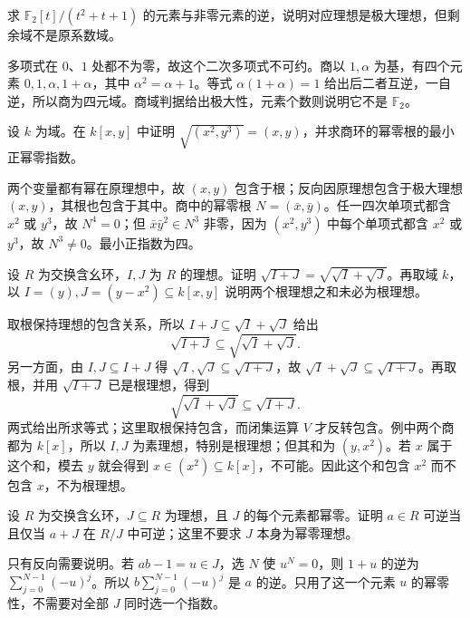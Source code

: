 \begin{exercise}\label{b3:ex:01-residue-field-four}
	求 \(\mathbb F_2[t]/(t^2+t+1)\) 的元素与非零元素的逆，说明对应理想是极大理想，但剩余域不是原系数域。
\end{exercise}
\begin{solution}
	多项式在 \(0\)、\(1\) 处都不为零，故这个二次多项式不可约。商以 \(1,\alpha\) 为基，有四个元素 \(0,1,\alpha,1+\alpha\)，其中 \(\alpha^2=\alpha+1\)。等式 \(\alpha(1+\alpha)=1\) 给出后二者互逆，一自逆，所以商为四元域。商域判据给出极大性，元素个数则说明它不是 \(\mathbb F_2\)。
\end{solution}

\begin{exercise}\label{b3:ex:01-radical-powers}
	设 \(k\) 为域。在 \(k[x,y]\) 中证明 \(\sqrt{(x^2,y^3)}=(x,y)\)，并求商环的幂零根的最小正幂零指数。
\end{exercise}
\begin{solution}
	两个变量都有幂在原理想中，故 \((x,y)\) 包含于根；反向因原理想包含于极大理想 \((x,y)\)，其根也包含于其中。商中的幂零根 \(N=(\bar x,\bar y)\)。任一四次单项式都含 \(x^2\) 或 \(y^3\)，故 \(N^4=0\)；但 \(\bar x\bar y^2\in N^3\) 非零，因为 \((x^2,y^3)\) 中每个单项式都含 \(x^2\) 或 \(y^3\)，故 \(N^3\ne0\)。最小正指数为四。
\end{solution}

\begin{exercise}\label{b3:ex:01-radical-sum}
	设 \(R\) 为交换含幺环，\(I,J\) 为 \(R\) 的理想。证明 \(\sqrt{I+J}=\sqrt{\sqrt I+\sqrt J}\)。再取域 \(k\)，以 \(I=(y),J=(y-x^2)\subseteq k[x,y]\) 说明两个根理想之和未必为根理想。
\end{exercise}
\begin{solution}
	取根保持理想的包含关系，所以 \(I+J\subseteq\sqrt I+\sqrt J\) 给出
	\[
		\sqrt{I+J}\subseteq\sqrt{\sqrt I+\sqrt J}.
	\]
	另一方面，由 \(I,J\subseteq I+J\) 得 \(\sqrt I,\sqrt J\subseteq\sqrt{I+J}\)，故 \(\sqrt I+\sqrt J\subseteq\sqrt{I+J}\)。再取根，并用 \(\sqrt{I+J}\) 已是根理想，得到
	\[
		\sqrt{\sqrt I+\sqrt J}\subseteq\sqrt{I+J}.
	\]
	两式给出所求等式；这里取根保持包含，而闭集运算 \(V\) 才反转包含。例中两个商都为 \(k[x]\)，所以 \(I,J\) 为素理想，特别是根理想；但其和为 \((y,x^2)\)。若 \(x\) 属于这个和，模去 \(y\) 就会得到 \(x\in(x^2)\subseteq k[x]\)，不可能。因此这个和包含 \(x^2\) 而不包含 \(x\)，不为根理想。
\end{solution}

\begin{exercise}\label{b3:ex:01-units-nil-quotient}
	设 \(R\) 为交换含幺环，\(J\subseteq R\) 为理想，且 \(J\) 的每个元素都幂零。证明 \(a\in R\) 可逆当且仅当 \(a+J\) 在 \(R/J\) 中可逆；这里不要求 \(J\) 本身为幂零理想。
\end{exercise}
\begin{solution}
	只有反向需要说明。若 \(ab-1=u\in J\)，选 \(N\) 使 \(u^N=0\)，则 \(1+u\) 的逆为 \(\sum_{j=0}^{N-1}(-u)^j\)。所以 \(b\sum_{j=0}^{N-1}(-u)^j\) 是 \(a\) 的逆。只用了这一个元素 \(u\) 的幂零性，不需要对全部 \(J\) 同时选一个指数。
\end{solution}

